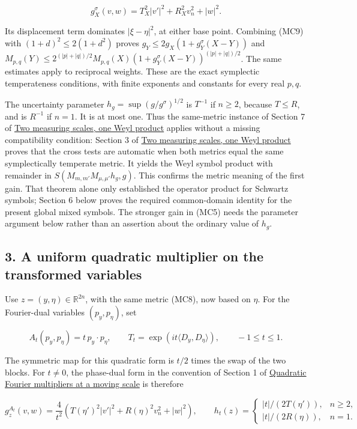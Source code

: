 \documentclass[
  11pt,
]{article}
\begin{document}
\[
g_X^\sigma(v,w)=T_X^2|v'|^2+R_X^2v_n^2+|w|^2.
\tag{MC10}
\]

Its displacement term dominates \(|\xi-\eta|^2\), at either base point.
Combining (MC9) with \((1+d)^2\leq2(1+d^2)\) proves
\(g_Y\leq2g_X(1+g_Y^\sigma(X-Y))\) and
\(M_{p,q}(Y)\leq2^{(|p|+|q|)/2}M_{p,q}(X)(1+g_Y^\sigma(X-Y))^{(|p|+|q|)/2}\).
The same estimates apply to reciprocal weights. These are the exact
symplectic temperateness conditions, with finite exponents and constants
for every real \(p,q\).

The uncertainty parameter \(h_g=\sup(g/g^\sigma)^{1/2}\) is \(T^{-1}\)
if \(n\geq2\), because \(T\leq R\), and is \(R^{-1}\) if \(n=1\). It is
at most one. Thus the same-metric instance of Section 7 of
\href{weyl-metric-products.pdf}{Two measuring scales, one Weyl product}
applies without a missing compatibility condition: Section 3 of
\href{weyl-metric-products.pdf}{Two measuring scales, one Weyl product}
proves that the cross tests are automatic when both metrics equal the
same symplectically temperate metric. It yields the Weyl symbol product
with remainder in \(S(M_{m,m'}M_{\mu,\mu'}h_g,g)\). This confirms the
metric meaning of the first gain. That theorem alone only established
the operator product for Schwartz symbols; Section 6 below proves the
required common-domain identity for the present global mixed symbols.
The stronger gain in (MC5) needs the parameter argument below rather
than an assertion about the ordinary value of \(h_g\).

\subsection{3. A uniform quadratic multiplier on the transformed
variables}\label{a-uniform-quadratic-multiplier-on-the-transformed-variables}

Use \(z=(y,\eta)\in\mathbb R^{2n}\), with the same metric (MC8), now
based on \(\eta\). For the Fourier-dual variables \((p_y,p_\eta)\), set

\[
A_t(p_y,p_\eta)=t\,p_y\cdot p_\eta,\qquad
T_t=\exp(i t\langle D_y,D_\eta\rangle),\qquad -1\leq t\leq1.
\tag{MC11}
\]

The symmetric map for this quadratic form is \(t/2\) times the swap of
the two blocks. For \(t\ne0\), the phase-dual form in the convention of
Section 1 of \href{gauss-transform-estimates.pdf}{Quadratic Fourier
multipliers at a moving scale} is therefore

\[
g_z^{A_t}(v,w)=\frac4{t^2}
\left(T(\eta')^2|v'|^2+R(\eta)^2v_n^2+|w|^2\right),
\qquad
h_t(z)=\begin{cases}|t|/(2T(\eta')),&n\geq2,\\|t|/(2R(\eta)),&n=1.\end{cases}
\tag{MC12}
\]
\end{document}
